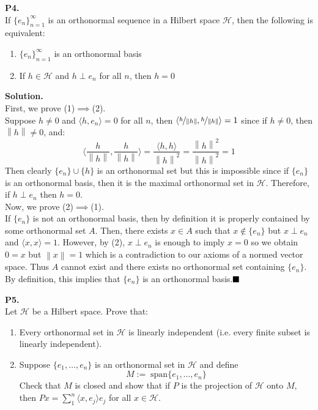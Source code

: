 \documentclass{article}
\newcommand{\norm}[1]{\left\lVert#1\right\rVert}
\begin{document}
    \textbf{P4.}\\

    If $\{e_n\}_{n=1}^{\infty}$ is an orthonormal sequence in a Hilbert space $\mathcal{H}$, then the following is equivalent:
    \begin{enumerate}
        \item $\{e_n\}_{n=1}^{\infty}$ is an orthonormal basis
        \item If $h\in\mathcal{H}$ and $h\perp e_n$ for all $n$, then $h=0$
    \end{enumerate}

    \textbf{Solution.}\\

    First, we prove (1)$\implies$(2).\\
    Suppose $h\neq 0$ and $\langle h,e_n\rangle = 0$ for all $n$, then $\langle \nicefrac{h}{\norm{h}},\nicefrac{h}{\norm{h}}\rangle=1$
    since if $h\neq 0$, then $\norm{h}\neq 0$, and:
    \[ \langle \frac{h}{\norm{h}},\frac{h}{\norm{h}}\rangle = \frac{\langle h,h\rangle}{\norm{h}^2} = \frac{\norm{h}^2}{\norm{h}^2} = 1\]
    Then clearly $\{e_n\}\cup \{h\}$ is an orthonormal set but this is impossible since if $\{e_n\}$ is an orthonormal basis, then
    it is the maximal orthonormal set in $\mathcal{H}$. Therefore, if $h\perp e_n$ then $h=0$.\\

    Now, we prove (2)$\implies$(1).\\
    If $\{e_n\}$ is not an orthonormal basis, then by definition it is properly contained by some orthonormal set $A$. Then,
    there exists $x\in A$ such that $x\not\in \{e_n\}$ but $x\perp e_n$ and $\langle x,x\rangle = 1$. However, by (2), $x\perp e_n$
    is enough to imply $x=0$ so we obtain $0 = x$ but $\norm{x} = 1$ which is a contradiction to our axioms of a normed vector space.
    Thus $A$ cannot exist and there exists no orthonormal set containing $\{e_n\}$. By definition, this implies that $\{e_n\}$
    is an orthonormal basis.$\hfill\blacksquare$

    \newpage

    \textbf{P5.}\\

    Let $\mathcal{H}$ be a Hilbert space. Prove that:
    \begin{enumerate}
        \item Every orthonormal set in $\mathcal{H}$ is linearly independent (i.e. every finite subset is linearly independent).
        \item Suppose $\{e_1,\hdots,e_n\}$ is an orthonormal set in $\mathcal{H}$ and define
            \[ M :=\;\text{span}\{e_1,\hdots,e_n\} \]
            Check that $M$ is closed and show that if $P$ is the projection of $\mathcal{H}$ onto $M$, then $Px = 
            \sum_1^n\langle x,e_j\rangle e_j$ for all $x\in\mathcal{H}$.
    \end{enumerate}
\end{document}
